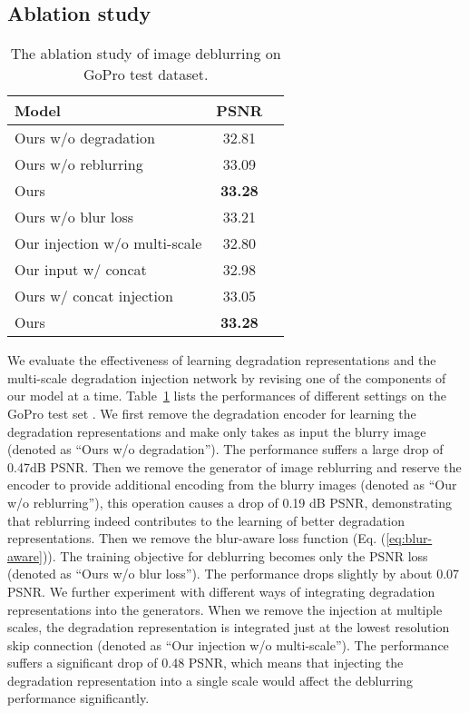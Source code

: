 \documentclass[runningheads]{llncs}
\begin{document}
\subsection{Ablation study}

\begin{table}[t]
\centering
		\begin{tabular}{l|cc}
			\hline
			Model & PSNR  \\  \hline 
			Ours w/o degradation & 32.81 \\
			Ours w/o reblurring & 33.09 \\ \hline
			Ours & \textbf{33.28}  \\\hline
			Ours w/o blur loss &  33.21 \\
			Our injection w/o multi-scale & 32.80 \\ 
			Our input w/ concat & 32.98 \\
			Ours w/ concat injection & 33.05  \\ \hline
			Ours & \textbf{33.28}  \\ \hline
		\end{tabular}
	\caption{The ablation study of image deblurring on GoPro test dataset\cite{deblur-multi-scale}.}
	\label{tb:ab_deblurring}
\end{table} We evaluate the effectiveness of learning degradation representations and the multi-scale degradation injection network by revising one of the components of our model at a time. Table~\ref{tb:ab_deblurring} lists the performances of different settings on the GoPro test set \cite{deblur-multi-scale}.
We first remove the degradation encoder for learning the degradation representations and make  only takes as input the blurry image (denoted as ``Ours w/o degradation'').
The performance suffers a large drop of 0.47dB PSNR. Then we remove the generator of image reblurring and reserve the encoder to provide additional encoding from the blurry images (denoted as ``Our w/o reblurring''), this operation causes a drop of 0.19 dB PSNR, demonstrating that reblurring indeed contributes to the learning of better degradation representations.
Then we remove the blur-aware loss function (Eq. (\ref{eq:blur-aware})). The training objective for deblurring becomes only the PSNR loss (denoted as ``Ours w/o blur loss''). The performance drops slightly by about 0.07 PSNR.
We further experiment with different ways of integrating degradation representations into the generators. 
When we remove the injection at multiple scales, the degradation representation is integrated just at the lowest resolution skip connection (denoted as ``Our injection w/o multi-scale''). The performance suffers a significant drop of 0.48 PSNR, which means that injecting the degradation representation into a single scale would affect the deblurring performance significantly.
\end{document}
